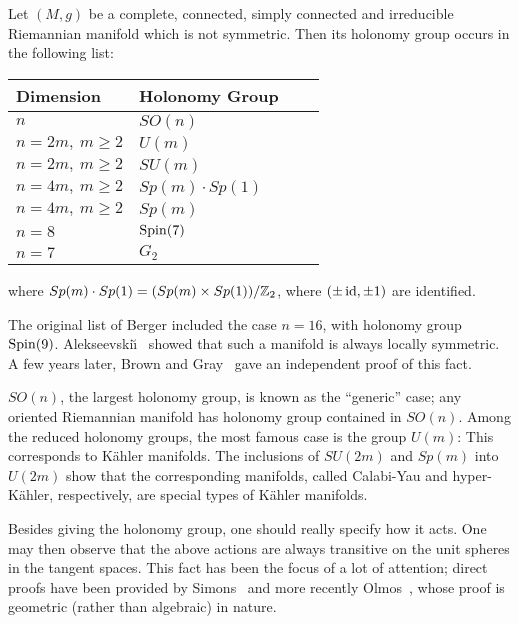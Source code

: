 \begin{thm}
	Let $(M,g)$ be a complete, connected, simply connected and irreducible Riemannian manifold which is not symmetric. Then its holonomy group occurs in the following list:
	\begin{center}
		\begin{tabular}{llll} \toprule
			Dimension				& Holonomy Group		\\ \midrule
			$n$ 					& $SO(n)$				\\
			$n=2m,\ m\geq 2$ 		& $U(m)$				\\
			$n=2m,\ m\geq 2$		& $SU(m)$ 				\\
			$n=4m,\ m\geq 2$		& $Sp(m)\cdot Sp(1)$	\\
			$n=4m,\ m\geq 2$		& $Sp(m)$				\\
			$n=8$					& $\operatorname{Spin}(7)$			\\
			$n=7$					& $G_2$					\\ \bottomrule
		\end{tabular}
	\end{center}
	where $Sp(m)\cdot Sp(1)=(Sp(m)\times Sp(1))/\mathbb{Z}_2$, where $(\pm \operatorname{id},\pm 1)$ are identified.
\end{thm}

\begin{rem}\leavevmode
	\begin{numberedlist}
		\item The original list of Berger included the case $n=16$, with holonomy group $\operatorname{Spin}(9)$. Alekseevski\u{\i}~\cite{Ale1967} showed that such a manifold is always locally symmetric. A few years later, Brown and Gray~\cite{BG1972} gave an independent proof of this fact.
		\item $SO(n)$, the largest holonomy group, is known as the ``generic'' case; any oriented Riemannian manifold has holonomy group contained in $SO(n)$. Among the reduced holonomy groups, the most famous case is the group $U(m)$: This corresponds to K\"ahler manifolds. The inclusions of $SU(2m)$ and $Sp(m)$ into $U(2m)$ show that the corresponding manifolds, called Calabi-Yau and hyper-K\"ahler, respectively, are special types of K\"ahler manifolds.
		\item Besides giving the holonomy group, one should really specify how it acts. One may then observe that the above actions are always transitive on the unit spheres in the tangent spaces. This fact has been the focus of a lot of attention; direct proofs have been provided by Simons~\cite{Sim1962} and more recently Olmos~\cite{Olm2005}, whose proof is geometric (rather than algebraic) in nature.
	\end{numberedlist} 
\end{rem}


